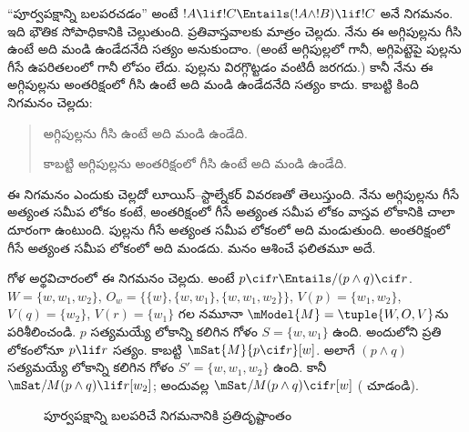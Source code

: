 \documentclass[../../../include/open-logic-section]{subfiles}
\begin{document}


``పూర్వపక్షాన్ని బలపరచడం'' అంటే
$!A \lif !C \Entails (!A \land !B) \lif !C$
అనే నిగమనం. ఇది భౌతిక సోపాధికానికి
చెల్లుతుంది. ప్రతివాస్తవాలకు మాత్రం
చెల్లదు. నేను ఈ అగ్గిపుల్లను గీసి
ఉంటే అది మండి ఉండేదనేది సత్యం
అనుకుందాం. (అంటే అగ్గిపుల్లలో గానీ,
అగ్గిపెట్టెపై పుల్లను గీసే ఉపరితలంలో గానీ లోపం లేదు.
పుల్లను విరగ్గొట్టడం వంటిదీ జరగదు.) కానీ నేను ఈ అగ్గిపుల్లను
అంతరిక్షంలో గీసి ఉంటే అది
మండి ఉండేదనేది సత్యం కాదు.
కాబట్టి కింది నిగమనం చెల్లదు:
\begin{quote}
  అగ్గిపుల్లను గీసి ఉంటే అది
  మండి ఉండేది.

  కాబట్టి అగ్గిపుల్లను
  అంతరిక్షంలో గీసి ఉంటే అది
  మండి ఉండేది.
\end{quote}

ఈ నిగమనం ఎందుకు చెల్లదో లూయిస్--స్టాల్నేకర్ వివరణతో
తెలుస్తుంది. నేను అగ్గిపుల్లను గీసే అత్యంత సమీప లోకం కంటే,
అంతరిక్షంలో గీసే అత్యంత సమీప లోకం వాస్తవ లోకానికి చాలా
దూరంగా ఉంటుంది. పుల్లను గీసే అత్యంత సమీప లోకంలో అది
మండుతుంది. అంతరిక్షంలో గీసే అత్యంత సమీప లోకంలో అది మండదు.
మనం ఆశించే ఫలితమూ అదే.

\begin{ex}
  గోళ అర్థవిచారంలో ఈ నిగమనం
  చెల్లదు. అంటే $p
  \cif r \Entails/ (p \land q) \cif r$.
  $W = \{w, w_1, w_2\}$,
  $O_w = \{\{w\}, \{w,
  w_1\}, \{w, w_1, w_2\}\}$,
  $V(p) = \{w_1, w_2\}$,
  $V(q) = \{w_2\}$,
  $V(r) = \{w_1\}$
  గల నమూనా $\mModel{M}
  = \tuple{W, O, V}$ను
  పరిశీలించండి. $p$ సత్యమయ్యే
  లోకాన్ని కలిగిన గోళం
  $S = \{w, w_1\}$ ఉంది.
  అందులోని ప్రతి లోకంలోనూ
  $p \lif r$ సత్యం. కాబట్టి
  $\mSat{M}{p
    \cif r}[w]$. అలాగే
  $(p \land q)$ సత్యమయ్యే
  లోకాన్ని కలిగిన గోళం
  $S' = \{w, w_1, w_2\}$
  ఉంది. కానీ
  $\mSat/{M}{(p \land q) \lif r}[w_2]$;
  అందువల్ల
  $\mSat/{M}{(p \land q) \cif r}[w]$
  ( చూడండి).

\begin{figure}
\begin{center}
\caption{పూర్వపక్షాన్ని బలపరిచే నిగమనానికి ప్రతిదృష్టాంతం}
\end{center}
\end{figure}
\end{ex}
\end{document}
